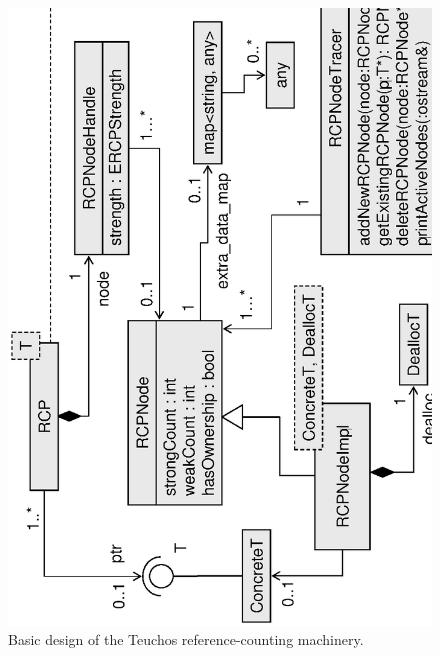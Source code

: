 \documentclass[pdf,ps2pdf,11pt]{SANDreport}
\begin{document}
{\bsinglespace
\begin{figure}
\begin{center}
\includegraphics*[angle=270,scale=0.65]{TeuchosRCPDesign}
\end{center}
\caption{
\label{fig:TeuchosRCPDesign}
Basic design of the Teuchos reference-counting machinery.  }
\end{figure}
\esinglespace}
\end{document}
